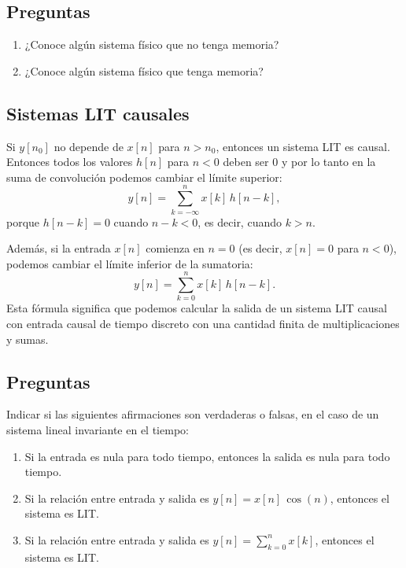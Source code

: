 \documentclass[11pt,a4paper,openany]{book}
\begin{document}
\subsection{Preguntas}

\begin{enumerate}
	\item ¿Conoce algún sistema físico que no tenga memoria?
	\item ¿Conoce algún sistema físico que tenga memoria?
\end{enumerate}

\subsection{Sistemas LIT causales}

Si $y[n_{0}]$ no depende de $x[n]$ para $n > n_{0}$, entonces un sistema LIT es causal. Entonces todos los valores $h[n]$ para $n < 0$ deben ser $0$ y por lo tanto en la suma de convolución podemos cambiar el límite superior:
\begin{equation}
	y[n] = \sum_{k=-\infty}^{n} x[k] \, h[n-k],
\end{equation}
porque $h[n-k] = 0$ cuando $n - k < 0$, es decir, cuando $k > n$.

Además, si la entrada $x[n]$ comienza en $n = 0$ (es decir, $x[n]=0$ para $n<0$), podemos cambiar el límite inferior de la sumatoria:
\begin{equation}
	y[n] = \sum_{k=0}^{n} x[k] \, h[n-k].
\end{equation}
Esta fórmula significa que podemos calcular la salida de un sistema LIT causal con entrada causal de tiempo discreto con una cantidad finita de multiplicaciones y sumas.

\subsection{Preguntas}

Indicar si las siguientes afirmaciones son verdaderas o falsas, en el caso de un sistema lineal invariante en el tiempo:

\begin{enumerate}
	\item Si la entrada es nula para todo tiempo, entonces la salida es nula para todo tiempo.
	\item Si la relación entre entrada y salida es $y[n] = x[n] \, \cos(n)$, entonces el sistema es LIT.
	\item Si la relación entre entrada y salida es $y[n] = \sum_{k=0}^{n} x[k]$, entonces el sistema es LIT.
\end{enumerate}
\end{document}
